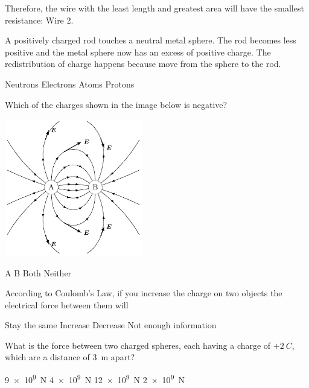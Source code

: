 \documentclass[answers]{exam}
\begin{document}
\begin{questions}
\begin{solution}
Therefore, the wire with the least length and greatest area will have the smallest resistance: Wire 2.
\end{solution}

\question
A positively charged rod touches a neutral metal sphere. The rod becomes less positive and the metal sphere now has an excess of positive charge. The redistribution of charge happens because \fillin[electrons] move from the sphere to the rod.

\begin{randomizechoices}
    \choice Neutrons
    \correctchoice Electrons
    \choice Atoms
    \choice Protons
\end{randomizechoices}

\question
Which of the charges shown in the image below is negative?

\begin{center}
    \includegraphics[width=6cm]{documents/figures/electric-field-lines-1.pdf}
\end{center}

\begin{randomizechoices}[norandomize]
    \choice A
    \correctchoice B
    \choice Both
    \choice Neither
\end{randomizechoices}

\question
According to Coulomb's Law, if you increase the charge on two objects the electrical force between them will

\begin{randomizechoices}[keeplast]
    \choice Stay the same
    \correctchoice Increase
    \choice Decrease
    \choice Not enough information 
\end{randomizechoices}

\question
What is the force between two charged spheres, each having a charge of $+\SI{2}{C}$, which are a distance of \SI{3}{m} apart?

\begin{randomizechoices}
    \choice \SI{9e9}{N}
    \choice \SI{4e9}{N}
    \correctchoice \SI{12e9}{N}
    \choice \SI{2e9}{N}
\end{randomizechoices}


\end{questions}
\end{document}
